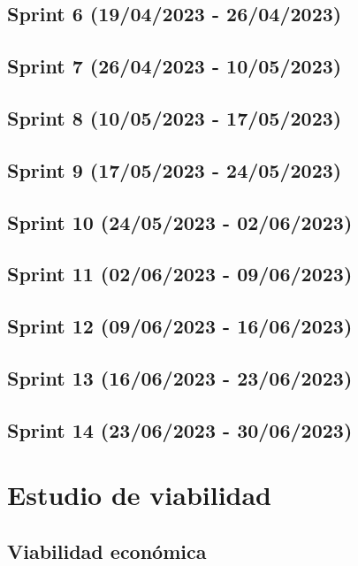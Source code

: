 \subsection{Sprint 6 (19/04/2023 - 26/04/2023)}

\subsection{Sprint 7 (26/04/2023 - 10/05/2023)}

\subsection{Sprint 8 (10/05/2023 - 17/05/2023)}

\subsection{Sprint 9 (17/05/2023 - 24/05/2023)}

\subsection{Sprint 10 (24/05/2023 - 02/06/2023)}

\subsection{Sprint 11 (02/06/2023 - 09/06/2023)}

\subsection{Sprint 12 (09/06/2023 - 16/06/2023)}

\subsection{Sprint 13 (16/06/2023 - 23/06/2023)}

\subsection{Sprint 14 (23/06/2023 - 30/06/2023)}

\section{Estudio de viabilidad}

\subsection{Viabilidad económica}

